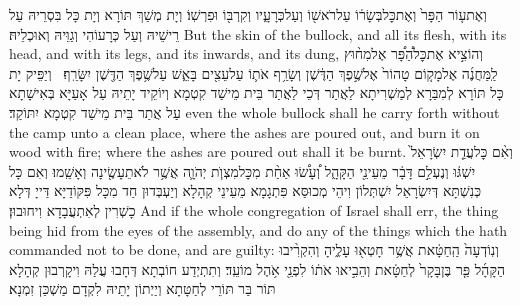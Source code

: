 {וְאֶת\maqqaf ע֤וֹר הַפָּר֙ וְאֶת\maqqaf כׇּל\maqqaf בְּשָׂר֔וֹ עַל\maqqaf רֹאשׁ֖וֹ וְעַל\maqqaf כְּרָעָ֑יו וְקִרְבּ֖וֹ וּפִרְשֽׁוֹ׃}
{וְיָת מְשַׁךְ תּוֹרָא וְיָת כָּל בִּסְרֵיהּ עַל רֵישֵׁיהּ וְעַל כְּרָעוֹהִי וְגַוֵּיהּ וְאוּכְלֵיהּ׃}
{But the skin of the bullock, and all its flesh, with its head, and with its legs, and its inwards, and its dung,}{}
{וְהוֹצִ֣יא אֶת\maqqaf כׇּל\maqqaf הַ֠פָּ֠ר אֶל\maqqaf מִח֨וּץ לַֽמַּחֲנֶ֜ה אֶל\maqqaf מָק֤וֹם טָהוֹר֙ אֶל\maqqaf שֶׁ֣פֶךְ הַדֶּ֔שֶׁן וְשָׂרַ֥ף אֹת֛וֹ עַל\maqqaf עֵצִ֖ים בָּאֵ֑שׁ עַל\maqqaf שֶׁ֥פֶךְ הַדֶּ֖שֶׁן יִשָּׂרֵֽף׃ \petucha }
{וְיַפֵּיק יָת כָּל תּוֹרָא לְמִבַּרָא לְמַשְׁרִיתָא לַאֲתַר דְּכֵי לַאֲתַר בֵּית מֵישַׁד קִטְמָא וְיוֹקֵיד יָתֵיהּ עַל אָעַיָּא בְּאִישָׁתָא עַל אֲתַר בֵּית מֵישַׁד קִטְמָא יִתּוֹקַד׃}
{even the whole bullock shall he carry forth without the camp unto a clean place, where the ashes are poured out, and burn it on wood with fire; where the ashes are poured out shall it be burnt.}{}
{וְאִ֨ם כׇּל\maqqaf עֲדַ֤ת יִשְׂרָאֵל֙ יִשְׁגּ֔וּ וְנֶעְלַ֣ם דָּבָ֔ר מֵעֵינֵ֖י הַקָּהָ֑ל וְ֠עָשׂ֠וּ אַחַ֨ת מִכׇּל\maqqaf מִצְוֺ֧ת יְהֹוָ֛ה אֲשֶׁ֥ר לֹא\maqqaf תֵעָשֶׂ֖ינָה וְאָשֵֽׁמוּ׃}
{וְאִם כָּל כְּנִשְׁתָּא דְּיִשְׂרָאֵל יִשְׁתְּלוֹן וִיהֵי מְכוּסַּא פִּתְגָמָא מֵעֵינֵי קְהָלָא וְיַעְבְּדוּן חַד מִכָּל פִּקּוֹדַיָּא דַּייָ דְּלָא כָשְׁרִין לְאִתְעֲבָדָא וִיחוּבוּן׃}
{And if the whole congregation of Israel shall err, the thing being hid from the eyes of the assembly, and do any of the things which the \lord\space hath commanded not to be done, and are guilty:}{}
{וְנֽוֹדְעָה֙ הַֽחַטָּ֔את אֲשֶׁ֥ר חָטְא֖וּ עָלֶ֑יהָ וְהִקְרִ֨יבוּ הַקָּהָ֜ל פַּ֤ר בֶּן\maqqaf בָּקָר֙ לְחַטָּ֔את וְהֵבִ֣יאוּ אֹת֔וֹ לִפְנֵ֖י אֹ֥הֶל מוֹעֵֽד׃}
{וְתִתְיְדַע חוֹבְתָא דְּחָבוּ עֲלַהּ וִיקָרְבוּן קְהָלָא תּוֹר בַּר תּוֹרֵי לְחַטָּתָא וְיַיְתוֹן יָתֵיהּ לִקְדָם מַשְׁכַּן זִמְנָא׃}
